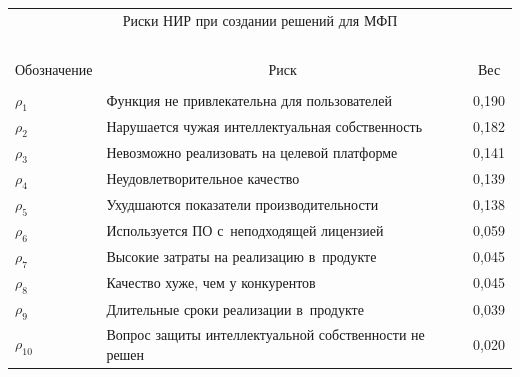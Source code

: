 \begin{table}\small


\begin{center}


\begin{tabular}{|l|l|c|}


\multicolumn{3}{c}{Риски НИР при создании решений для МФП}\\


\multicolumn{3}{c}{\ }\\[-6pt]


\hline


\multicolumn{1}{|c|}{Обозначение}&\multicolumn{1}{c|}{Риск}&Вес\\


\hline


&&\\[-10pt]


\hspace*{7mm}$\rho_1$&Функция не привлекательна для пользователей&0,190\\


\hspace*{7mm}$\rho_2$&Нарушается чужая интеллектуальная собственность&0,182\\


\hspace*{7mm}$\rho_3$&Невозможно реализовать на целевой платформе&0,141\\


\hspace*{7mm}$\rho_4$&Неудовлетворительное качество &0,139\\


\hspace*{7mm}$\rho_5$&Ухудшаются показатели производительности&0,138\\


\hspace*{7mm}$\rho_6$&Используется ПО с~неподходящей лицензией&0,059\\


\hspace*{7mm}$\rho_7$&Высокие затраты на реализацию в~продукте&0,045\\


\hspace*{7mm}$\rho_8$&Качество хуже, чем у конкурентов&0,045\\


\hspace*{7mm}$\rho_9$&Длительные сроки реализации в~продукте&0,039\\


\hspace*{7mm}$\rho_{10}$\hphantom{9}&Вопрос защиты интеллектуальной собственности не решен&0,020\\


\hline


\end{tabular}


\end{center}


\end{table}





